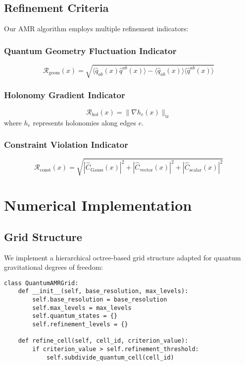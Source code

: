 \documentclass[11pt]{article}
\begin{document}
\subsection{Refinement Criteria}

Our AMR algorithm employs multiple refinement indicators:

\subsubsection{Quantum Geometry Fluctuation Indicator}
\begin{equation}
\mathcal{R}_{\text{geom}}(x) = \sqrt{\langle\hat{q}_{ab}(x)\hat{q}^{ab}(x)\rangle - \langle\hat{q}_{ab}(x)\rangle\langle\hat{q}^{ab}(x)\rangle}
\end{equation}

\subsubsection{Holonomy Gradient Indicator}
\begin{equation}
\mathcal{R}_{\text{hol}}(x) = \|\nabla h_e(x)\|_{\text{tr}}
\end{equation}
where $h_e$ represents holonomies along edges $e$.

\subsubsection{Constraint Violation Indicator}
\begin{equation}
\mathcal{R}_{\text{const}}(x) = \sqrt{|\hat{C}_{\text{Gauss}}(x)|^2 + |\hat{C}_{\text{vector}}(x)|^2 + |\hat{C}_{\text{scalar}}(x)|^2}
\end{equation}

\section{Numerical Implementation}

\subsection{Grid Structure}

We implement a hierarchical octree-based grid structure adapted for quantum gravitational degrees of freedom:

\begin{verbatim}
class QuantumAMRGrid:
    def __init__(self, base_resolution, max_levels):
        self.base_resolution = base_resolution
        self.max_levels = max_levels
        self.quantum_states = {}
        self.refinement_levels = {}
        
    def refine_cell(self, cell_id, criterion_value):
        if criterion_value > self.refinement_threshold:
            self.subdivide_quantum_cell(cell_id)
\end{verbatim}
\end{document}
